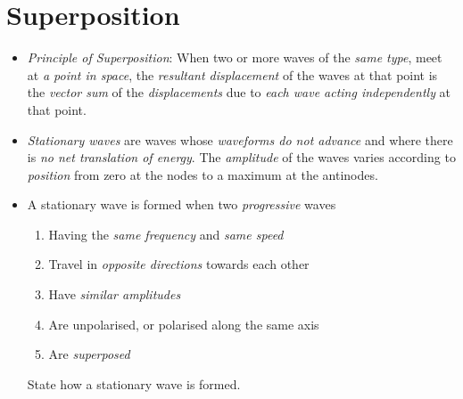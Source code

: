 \documentclass[oneside]{book}
\begin{document}
\chapter{Superposition}
\begin{itemize}
    \item \emph{Principle of Superposition}: When two or more waves of the \emph{same type}, meet at \emph{a point in space}, the \emph{resultant displacement} of the waves at that point is the \emph{vector sum} of the \emph{displacements} due to \emph{each wave acting independently} at that point.
    \item \emph{Stationary waves} are waves whose \emph{waveforms do not advance} and where there is \emph{no net translation of energy}. The \emph{amplitude} of the waves varies according to \emph{position} from zero at the nodes to a maximum at the antinodes.
    \item A stationary wave is formed when two \emph{progressive} waves
    \begin{enumerate}
        \item Having the \emph{same frequency} and \emph{same speed}
        \item Travel in \emph{opposite directions} towards each other
        \item Have \emph{similar amplitudes}
        \item Are unpolarised, or polarised along the same axis
        \item Are \emph{superposed} 
    \end{enumerate}
    \begin{example}{}{}
        State how a stationary wave is formed.


\end{example}
\end{itemize}
\end{document}
